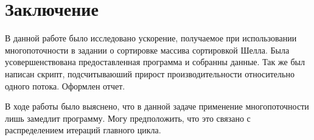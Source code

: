 \documentclass[a4paper, 12pt]{article}
\begin{document}




\section{Заключение}

В данной работе было исследовано ускорение, получаемое при использовании многопоточности в задании о сортировке массива сортировкой Шелла.
Была усовершенствована предоставленная программа и собранны данные.
Так же был написан скрипт, подсчитываюший прирост производительности относительно одного потока.
Оформлен отчет.

В ходе работы было выяснено, что в данной задаче применение многопоточности лишь замедлит программу.
Могу предположить, что это связано с распределением итераций главного цикла.


\end{document}
